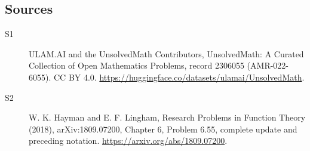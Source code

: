 \documentclass[11pt]{article}
\begin{document}
\subsection{Sources}
\begin{description}
\item[\hypertarget{source:2306055:1}{S1}] ULAM.AI and the UnsolvedMath Contributors, UnsolvedMath: A Curated Collection of Open Mathematics Problems, record 2306055 (AMR-022-6055). CC BY 4.0. \url{https://huggingface.co/datasets/ulamai/UnsolvedMath}.
\item[\hypertarget{source:2306055:2}{S2}] W. K. Hayman and E. F. Lingham, Research Problems in Function Theory (2018), arXiv:1809.07200, Chapter 6, Problem 6.55, complete update and preceding notation. \url{https://arxiv.org/abs/1809.07200}.
\end{description}
\label{end:2306055}
\end{document}

